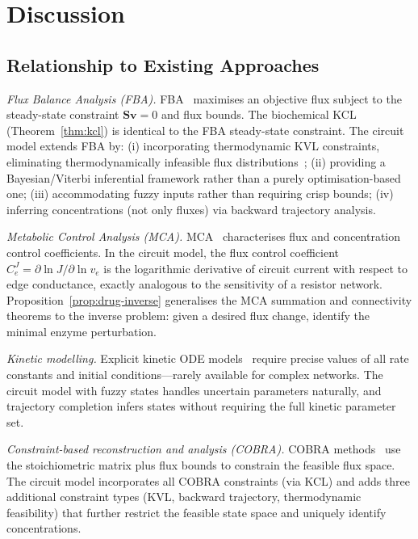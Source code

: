 \documentclass[twocolumn,10pt,a4paper]{article}
\begin{document}
\section{Discussion}
\label{sec:discussion}

\subsection{Relationship to Existing Approaches}
\label{sec:disc-existing}

\emph{Flux Balance Analysis (FBA).}
FBA~\cite{Orth2010,Palsson2006,Price2004} maximises an objective flux subject
to the steady-state constraint $\mathbf{S}\mathbf{v}=0$ and flux bounds.  The
biochemical KCL (Theorem~\ref{thm:kcl}) is identical to the FBA steady-state
constraint.  The circuit model extends FBA by: (i) incorporating thermodynamic
KVL constraints, eliminating thermodynamically infeasible flux
distributions~\cite{Price2004}; (ii) providing a Bayesian/Viterbi inferential
framework rather than a purely optimisation-based one; (iii) accommodating
fuzzy inputs rather than requiring crisp bounds; (iv) inferring concentrations
(not only fluxes) via backward trajectory analysis.

\emph{Metabolic Control Analysis (MCA).}
MCA~\cite{KacserBurns1973,FellSauro1985,Fell1992,HeinrichSchuster1996}
characterises flux and concentration control coefficients.  In the circuit
model, the flux control coefficient $C^J_e=\partial\ln J/\partial\ln v_e$
is the logarithmic derivative of circuit current with respect to edge
conductance, exactly analogous to the sensitivity of a resistor network.
Proposition~\ref{prop:drug-inverse} generalises the MCA summation and
connectivity theorems to the inverse problem: given a desired flux change,
identify the minimal enzyme perturbation.

\emph{Kinetic modelling.}
Explicit kinetic ODE models~\cite{Murray2002,Klipp2005,Voit2000book} require
precise values of all rate constants and initial conditions---rarely available
for complex networks.  The circuit model with fuzzy states handles uncertain
parameters naturally, and trajectory completion infers states without requiring
the full kinetic parameter set.

\emph{Constraint-based reconstruction and analysis (COBRA).}
COBRA methods~\cite{Palsson2015,Price2004} use the stoichiometric matrix plus
flux bounds to constrain the feasible flux space.  The circuit model incorporates
all COBRA constraints (via KCL) and adds three additional constraint types (KVL,
backward trajectory, thermodynamic feasibility) that further restrict the
feasible state space and uniquely identify concentrations.
\end{document}
